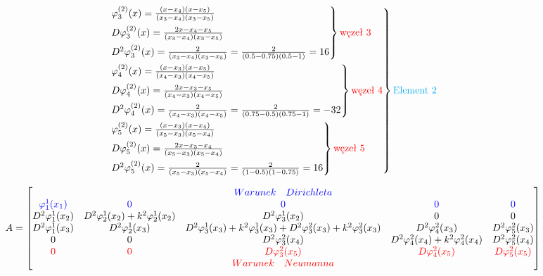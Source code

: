 \documentclass[9pt, a4paper]{article}
\begin{document}
\begin{align*}
\begin{rcases}
\begin{rcases}
\varphi_3^{(2)}(x)=\frac{(x-x_4)(x-x_5)}{(x_3-x_4)(x_3-x_5)}\\
D\varphi_3^{(2)}(x)=\frac{2x-x_4-x_5}{(x_3-x_4)(x_3-x_5)}\\
D^2\varphi_3^{(2)}(x)=\frac{2}{(x_3-x_4)(x_3-x_5)}=\frac{2}{(0.5-0.75)(0.5-1)}=16
\end{rcases}
\text{\textcolor{red}{węzeł 3}}\\
\begin{rcases}
\varphi_4^{(2)}(x)=\frac{(x-x_3)(x-x_5)}{(x_4-x_3)(x_4-x_5)}\\
D\varphi_4^{(2)}(x)=\frac{2x-x_3-x_5}{(x_4-x_3)(x_4-x_5)}\\
D^2\varphi_4^{(2)}(x)=\frac{2}{(x_4-x_3)(x_4-x_5)}=\frac{2}{(0.75-0.5)(0.75-1)}=-32
\end{rcases}
\text{\textcolor{red}{węzeł 4}}\\
\begin{rcases}
\varphi_5^{(2)}(x)=\frac{(x-x_3)(x-x_4)}{(x_5-x_3)(x_5-x_4)}\\
D\varphi_5^{(2)}(x)=\frac{2x-x_3-x_4}{(x_5-x_3)(x_5-x_4)}\\
D^2\varphi_5^{(2)}(x)=\frac{2}{(x_5-x_3)(x_5-x_4)}=\frac{2}{(1-0.5)(1-0.75)}=16
\end{rcases}
\text{\textcolor{red}{węzeł 5}}
\end{rcases}
\text{\textcolor{cyan}{Element 2}}
\end{align*}

\newpage

\[
A=
\begin{bmatrix}
&&\textcolor{blue}{Warunek\quad Dirichleta}&&\\
\color{blue}\varphi_1^1(x_1)&\color{blue}0&\color{blue}0&\color{blue}0&\color{blue}0\\
D^2\varphi_1^1(x_2)&D^2\varphi_2^1(x_2)+k^2\varphi_2^1(x_2)&D^2\varphi_3^1(x_2)&0&0\\
D^2\varphi_1^1(x_3)&D^2\varphi_2^1(x_3)&D^2\varphi_3^1(x_3)+k^2\varphi_3^1(x_3)+D^2\varphi_3^2(x_3)+k^2\varphi_3^2(x_3)&D^2\varphi_4^2(x_3)&D^2\varphi_5^2(x_3)\\
0&0&D^2\varphi_3^2(x_4)&D^2\varphi_4^2(x_4)+k^2\varphi_4^2(x_4)&D^2\varphi_5^2(x_4)\\
\color{red}0&\color{red}0&\color{red}D\varphi_3^2(x_5)&\color{red}D\varphi_4^2(x_5)&\color{red}D\varphi_5^2(x_5)\\
&&\textcolor{red}{Warunek\quad Neumanna}&&
\end{bmatrix}
\]
\end{document}

